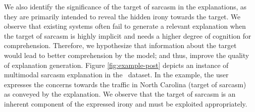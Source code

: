 
We also identify the significance of the target of sarcasm in the explanations, as they are primarily intended to reveal the hidden irony towards the target. We observe that existing systems often fail to generate a relevant explanation when the target of sarcasm is highly implicit and needs a higher degree of cognition for comprehension. Therefore, we hypothesize that information about the target would lead to better comprehension by the model; and thus, improve the quality of explanation generation. Figure \ref{fig:example-post} depicts an instance of multimodal sarcasm explanation in the \dataset\ dataset. In the example, the user expresses the concerns towards the traffic in North Carolina (target of sarcasm) as conveyed by the explanation. We observe that the target of sarcasm is an inherent component of the expressed irony and must be exploited appropriately. 

